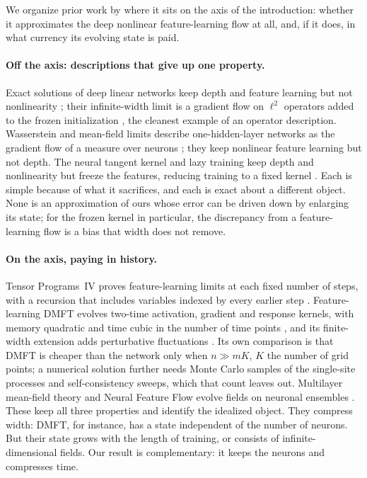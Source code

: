 \documentclass[11pt]{article}
\theoremstyle{definition}
\theoremstyle{remark}
\begin{document}
We organize prior work by where it sits on the axis of the introduction: whether
it approximates the deep nonlinear feature-learning flow at all, and, if it
does, in what currency its evolving state is paid.

\paragraph{Off the axis: descriptions that give up one property.}
Exact solutions of deep linear networks keep depth and feature learning but not
nonlinearity \citep{saxe2014exact}; their infinite-width limit is a gradient
flow on $\ell^2$ operators added to the frozen initialization
\citep{chizat2024linear}, the cleanest example of an operator description.
Wasserstein and mean-field limits describe one-hidden-layer networks as the
gradient flow of a measure over neurons
\citep{chizat2018global,mei2018meanfield,sirignano2019lln}; they keep nonlinear
feature learning but not depth.  The neural tangent kernel and lazy training
keep depth and nonlinearity but freeze the features, reducing training to a
fixed kernel \citep{jacot2018ntk,lee2019wide,chizat2019lazy}.  Each is simple
because of what it sacrifices, and each is exact about a different object.
None is an approximation of ours whose error can be driven down by enlarging
its state; for the frozen kernel in particular, the discrepancy from a
feature-learning flow is a bias that width does not remove.

\paragraph{On the axis, paying in history.}
Tensor Programs~IV proves feature-learning limits at each fixed number of steps,
with a recursion that includes variables indexed by every earlier step
\citep{yang2021tensor}.  Feature-learning DMFT evolves two-time activation,
gradient and response kernels, with memory quadratic and time cubic in the
number of time points \citep{bordelon2022dmft}, and its finite-width extension
adds perturbative fluctuations \citep{bordelon2023finite}.  Its own comparison
is that DMFT is cheaper than the network only when $n\gg mK$, $K$ the number of
grid points; a numerical solution further needs Monte Carlo samples of the
single-site processes and self-consistency sweeps, which that count leaves out.
Multilayer mean-field theory and Neural Feature Flow evolve fields on neuronal
ensembles \citep{nguyen2023rigorous,fang2020features}.  These keep all three
properties and identify the idealized object.  They compress width: DMFT, for
instance, has a state independent of the number of neurons.  But their state
grows with the length of training, or consists of infinite-dimensional fields.
Our result is complementary: it keeps the neurons and compresses time.
\end{document}
